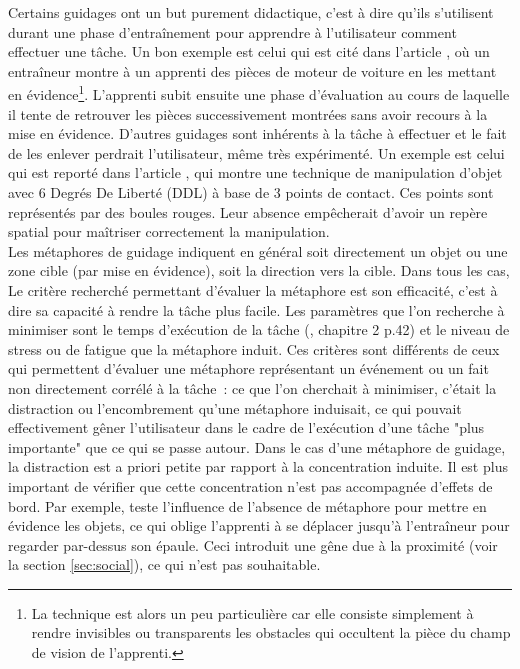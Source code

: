 \documentclass[11pt]{article}
\begin{document}
Certains guidages ont un but purement didactique, c'est à dire qu'ils s'utilisent durant une phase d'entraînement pour apprendre à l'utilisateur comment effectuer une tâche. Un bon exemple est celui qui est cité dans l'article \cite{show-through}, où un entraîneur montre à un apprenti des pièces de moteur de voiture en les mettant en évidence\footnote{La technique est alors un peu particulière car elle consiste simplement à rendre invisibles ou transparents les obstacles qui occultent la pièce du champ de vision de l'apprenti.}. L'apprenti subit ensuite une phase d'évaluation au cours de laquelle il tente de retrouver les pièces successivement montrées sans avoir recours à la mise en évidence. D'autres guidages sont inhérents à la tâche à effectuer et le fait de les enlever perdrait l'utilisateur, même très expérimenté. Un exemple est celui qui est reporté dans l'article \cite{3-hand}, qui montre une technique de manipulation d'objet avec 6 Degrés De Liberté (DDL) à base de 3 points de contact. Ces points sont représentés par des boules rouges. Leur absence empêcherait d'avoir un repère spatial pour maîtriser correctement la manipulation.
\\

Les métaphores de guidage indiquent en général soit directement un objet ou une zone cible (par mise en évidence), soit la direction vers la cible. Dans tous les cas, Le critère recherché permettant d'évaluer la métaphore est son efficacité, c'est à dire sa capacité à rendre la tâche plus facile. Les paramètres que l'on recherche à minimiser sont le temps d'exécution de la tâche (\cite{trv2}, chapitre 2 p.42) et le niveau de stress ou de fatigue que la métaphore induit. Ces critères sont différents de ceux qui permettent d'évaluer une métaphore représentant un événement ou un fait non directement corrélé à la tâche~: ce que l'on cherchait à minimiser, c'était la distraction ou l'encombrement qu'une métaphore induisait, ce qui pouvait effectivement gêner l'utilisateur dans le cadre de l'exécution d'une tâche "plus importante" que ce qui se passe autour. Dans le cas d'une métaphore de guidage, la distraction est a priori petite par rapport à la concentration induite. Il est plus important de vérifier que cette concentration n'est pas accompagnée d'effets de bord. Par exemple, \cite{show-through} teste l'influence de l'absence de métaphore pour mettre en évidence les objets, ce qui oblige l'apprenti à se déplacer jusqu'à l'entraîneur pour regarder par-dessus son épaule. Ceci introduit une gêne due à la proximité (voir la section \ref{sec:social}), ce qui n'est pas souhaitable.
\\
\end{document}
